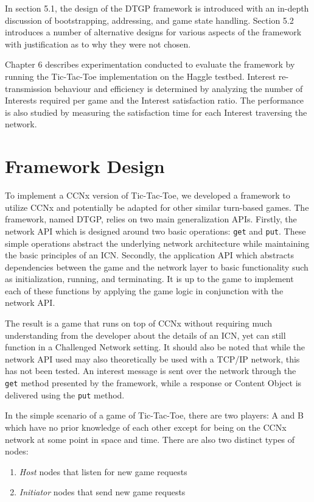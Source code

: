 \documentclass[a4paper,12pt]{report}      %
\begin{document}
In section 5.1, the design of the DTGP framework is introduced with an in-depth discussion of bootstrapping,
addressing, and game state handling. Section 5.2 introduces a number of alternative designs for various aspects 
of the framework with justification as to why they were not chosen. 

Chapter 6 describes experimentation conducted to evaluate the framework by running the Tic-Tac-Toe implementation on the Haggle testbed. Interest re-transmission behaviour and efficiency is determined by analyzing the number of Interests required per game and the Interest satisfaction ratio. The performance is also studied by measuring the satisfaction time for each Interest traversing the network.    

\section{Framework Design}

To implement a CCNx version of Tic-Tac-Toe, we developed a framework to utilize CCNx and potentially be adapted 
for other similar turn-based games. The framework, named DTGP, relies on two main generalization APIs.
Firstly, the network API which is designed around two basic operations: \verb!get! and \verb!put!. These simple
operations abstract the underlying network architecture while maintaining the basic principles of an
ICN. Secondly, the application API which abstracts dependencies between the game and the
network layer to basic functionality such as initialization, running, and terminating. It is up to the game
to implement each of these functions by applying the game logic in conjunction with the network API.

The result is a game that runs on top of CCNx without requiring much understanding from the
developer about the details of an ICN, yet can still function in a Challenged Network setting. It should
also be noted that while the network API used may also theoretically be used with a TCP/IP network,
this has not been tested. An interest message is sent over the network through the \verb!get! method presented
 by the framework, while  a response or Content Object is delivered using the \verb!put! method. 

In the simple scenario of a game of Tic-Tac-Toe, there are two players: A and B which have no prior
knowledge of each other except for being on the CCNx network at some point in space and time. There
are also two distinct types of nodes: 
\begin{enumerate}
\item \emph{Host} nodes that listen for new game requests
\item \emph{Initiator} nodes that send new game requests 
\end{enumerate}
\end{document}
